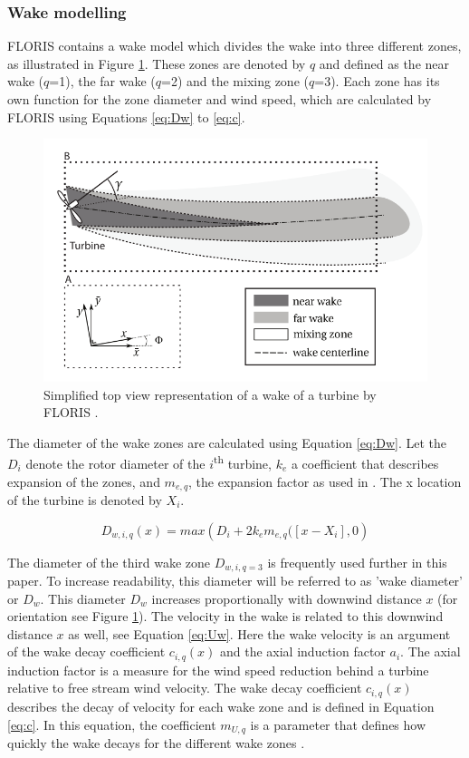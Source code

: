 \subsubsection{Wake modelling}
\label{wakemodel}
FLORIS contains a wake model which divides the wake into three different zones, as illustrated in Figure \ref{fig:wake}. These zones are denoted by $q$ and defined as the near wake ($q$=1), the far wake ($q$=2) and the mixing zone ($q$=3). Each zone has its own function for the zone diameter and wind speed, which are calculated by FLORIS using Equations \ref{eq:Dw} to \ref{eq:c}. 


\begin{figure}
  	\includegraphics[width=\linewidth]{./Figures/WakeFLORIS.png}
  	\caption{Simplified top view representation of a wake of a turbine by FLORIS \cite{Gebraad2016}.}
	\label{fig:wake}
\end{figure}

The diameter of the wake zones are calculated using Equation \ref{eq:Dw}. Let the $D_i$ denote the rotor diameter of the $i${\textsuperscript{th}} turbine, $k_e$ a coefficient that describes expansion of the zones, and $m_{e,q}$, the expansion factor as used in \cite{Gebraad2016}. The x location of the turbine is denoted by $X_i$.

\begin{equation}
\label{eq:Dw}
D_{w,i,q}(x) = max({D_i + 2k_em_{e,q}([x - X_i],0} )
\end{equation}

The diameter of the third wake zone $D_{w,i,q=3}$ is frequently used further in this paper. To increase readability, this diameter will be referred to as 'wake diameter' or $D_w$. This diameter $D_w$ increases proportionally with downwind distance $x$ (for orientation see Figure \ref{fig:wake}).
The velocity in the wake is related to this downwind distance $x$ as well, see Equation \ref{eq:Uw}. Here the wake velocity is an argument of the wake decay coefficient $c_{i,q}(x)$ and the axial induction factor $a_i$. The axial induction factor is a measure for the wind speed reduction behind a turbine relative to free stream wind velocity. The wake decay coefficient $c_{i,q}(x)$ describes the decay of velocity for each wake zone and is defined in Equation \ref{eq:c}. In this equation, the coefficient $m_{U,q}$ is a parameter that defines how quickly the wake decays for the different wake zones \cite{Gebraad2016}.

